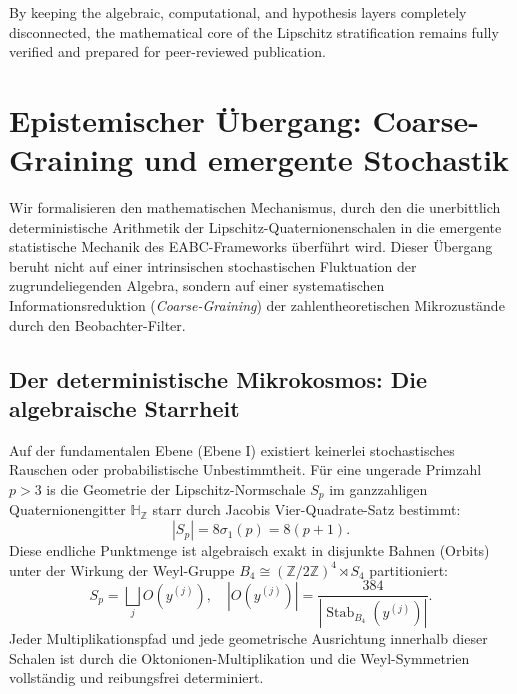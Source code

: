 \documentclass[11pt,a4paper]{article}
\theoremstyle{definition}
\begin{document}
	By keeping the algebraic, computational, and hypothesis layers completely disconnected, the mathematical core of the Lipschitz stratification remains fully verified and prepared for peer-reviewed publication.
	
	
	\section{Epistemischer Übergang: Coarse-Graining und emergente Stochastik}
	\label{sec:coarse_graining_stochastik}
	
	Wir formalisieren den mathematischen Mechanismus, durch den die unerbittlich deterministische Arithmetik der Lipschitz-Quaternionenschalen in die emergente statistische Mechanik des EABC-Frameworks überführt wird. Dieser Übergang beruht nicht auf einer intrinsischen stochastischen Fluktuation der zugrundeliegenden Algebra, sondern auf einer systematischen Informationsreduktion (\emph{Coarse-Graining}) der zahlentheoretischen Mikrozustände durch den Beobachter-Filter.
	
	\subsection{Der deterministische Mikrokosmos: Die algebraische Starrheit}
	Auf der fundamentalen Ebene (Ebene I) existiert keinerlei stochastisches Rauschen oder probabilistische Unbestimmtheit. Für eine ungerade Primzahl $p > 3$ is die Geometrie der Lipschitz-Normschale $S_p$ im ganzzahligen Quaternionengitter $\mathbb{H}_{\mathbb{Z}}$ starr durch Jacobis Vier-Quadrate-Satz bestimmt:
	\begin{equation}
		|S_p| = 8\sigma_1(p) = 8(p+1).
	\end{equation}
	Diese endliche Punktmenge ist algebraisch exakt in disjunkte Bahnen (Orbits) unter der Wirkung der Weyl-Gruppe $B_4 \cong (\mathbb{Z}/2\mathbb{Z})^4 \rtimes S_4$ partitioniert:
	\begin{equation}
		S_p = \bigsqcup_{j} O(y^{(j)}), \quad |O(y^{(j)})| = \frac{384}{|\operatorname{Stab}_{B_4}(y^{(j)})|}.
	\end{equation}
	Jeder Multiplikationspfad und jede geometrische Ausrichtung innerhalb dieser Schalen ist durch die Oktonionen-Multiplikation und die Weyl-Symmetrien vollständig und reibungsfrei determiniert.
	
\end{document}
